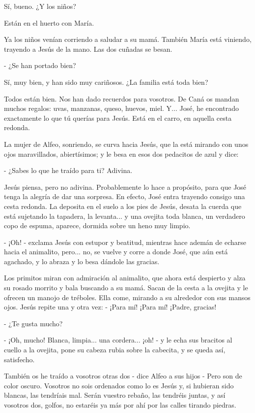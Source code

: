 \documentclass[12pt, twoside, openright]{book} %
\begin{document}
Sí, bueno. ¿Y los niños? 

Están en el huerto con María. 

Ya los niños venían corriendo a saludar a su mamá. También María está viniendo, trayendo a Jesús de la mano. Las dos cuñadas se besan. 

- ¿Se han portado bien? 

Sí, muy bien, y han sido muy cariñosos. ¿La familia está toda bien? 

Todos están bien. Nos han dado recuerdos para vosotros. De Caná os mandan muchos regalos: uvas, manzanas, queso, huevos, miel. Y... José, he encontrado exactamente lo que tú querías para Jesús. Está en el carro, en aquella cesta redonda. 

La mujer de Alfeo, sonriendo, se curva hacia Jesús, que la está mirando con unos ojos maravillados, abiertísimos; y le besa en esos dos pedacitos de azul y dice: 

- ¿Sabes lo que he traído para ti? Adivina. 

Jesús piensa, pero no adivina. Probablemente lo hace a propósito, para que José tenga la alegría de dar una sorpresa. En efecto, José entra trayendo consigo una cesta redonda. La deposita en el suelo a los pies de Jesús, desata la cuerda que está sujetando la tapadera, la levanta... y una ovejita toda blanca, un verdadero copo de espuma, aparece, dormida sobre un heno muy limpio. 

- ¡Oh! - exclama Jesús con estupor y beatitud, mientras hace ademán de echarse hacia el animalito, pero... no, se vuelve y corre a donde José, que aún está agachado, y lo abraza y lo besa dándole las gracias. 

Los primitos miran con admiración al animalito, que ahora está despierto y alza su rosado morrito y bala buscando a su mamá. Sacan de la cesta a la ovejita y le ofrecen un manojo de tréboles. Ella come, mirando a su alrededor con sus mansos ojos. Jesús repite una y otra vez: - ¡Para mí! ¡Para mí! ¡Padre, gracias! 

- ¿Te gusta mucho? 

- ¡Oh, mucho! Blanca, limpia... una cordera... ¡oh! - y le echa sus bracitos al cuello a la ovejita, pone su cabeza rubia sobre la cabecita, y se queda así, satisfecho. 

También os he traído a vosotros otras dos - dice Alfeo a sus hijos - Pero son de color oscuro. Vosotros no sois ordenados como lo es Jesús y, si hubieran sido blancas, las tendríais mal. Serán vuestro rebaño, las tendréis juntas, y así vosotros dos, golfos, no estaréis ya más por ahí por las calles tirando piedras. 
\end{document}
